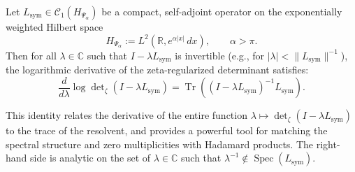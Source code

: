\begin{lemma}
\label{lem:A_log_derivative}
Let \( L_{\mathrm{sym}} \in \mathcal{C}_1(H_{\Psi_\alpha}) \) be a compact, self-adjoint operator on the exponentially weighted Hilbert space
\[
H_{\Psi_\alpha} := L^2(\mathbb{R}, e^{\alpha|x|}\, dx), \qquad \alpha > \pi.
\]
Then for all \( \lambda \in \mathbb{C} \) such that \( I - \lambda L_{\mathrm{sym}} \) is invertible (e.g., for \( |\lambda| < \|L_{\mathrm{sym}}\|^{-1} \)), the logarithmic derivative of the zeta-regularized determinant satisfies:
\[
\frac{d}{d\lambda} \log \det\nolimits_\zeta(I - \lambda L_{\mathrm{sym}})
= \operatorname{Tr} \left( (I - \lambda L_{\mathrm{sym}})^{-1} L_{\mathrm{sym}} \right).
\]

\medskip
\noindent
This identity relates the derivative of the entire function \( \lambda \mapsto \det_\zeta(I - \lambda L_{\mathrm{sym}}) \) to the trace of the resolvent, and provides a powerful tool for matching the spectral structure and zero multiplicities with Hadamard products. The right-hand side is analytic on the set of \( \lambda \in \mathbb{C} \) such that \( \lambda^{-1} \notin \operatorname{Spec}(L_{\mathrm{sym}}) \).
\end{lemma}
%  